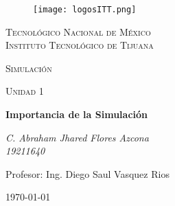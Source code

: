 \documentclass[letterpaper, 12pt]{article}
\begin{document}
    
    \begin{titlepage}
        \begin{figure}[ht]
            \centering
            \texttt{[image: logosITT.png]}
        \end{figure}
        \centering
        {\scshape\LARGE Tecnológico Nacional de México\\Instituto Tecnológico de Tijuana\par}
        \vspace{1cm}
        {\scshape\Large Simulación\par}
        \vspace{1cm}
        {\scshape\Large Unidad 1\par}
        \vspace{1.5cm}
        {\huge\bfseries Importancia de la Simulación\par}
        \vspace{2cm}
        {\Large\itshape C. Abraham Jhared Flores Azcona\\19211640\par}
        \vfill
        Profesor: Ing. Diego Saul Vasquez Rios\par
    
        \vfill

        {\large \today}
    \end{titlepage}
\end{document}
